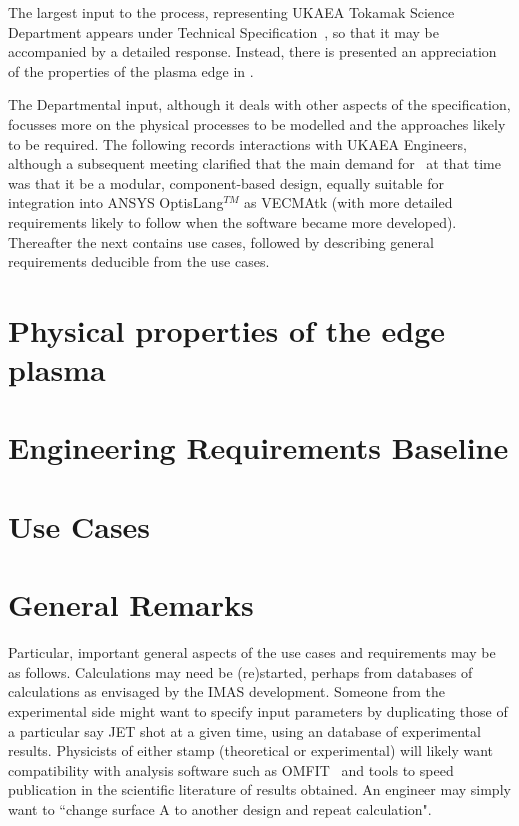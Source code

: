 
The largest input to the process, representing UKAEA Tokamak Science
Department appears under Technical Specification~, so that it may
be accompanied by a detailed response. Instead, there is presented an appreciation
of the properties of the plasma edge in .

The Departmental input, although it deals with other aspects of the specification,
focusses more on the physical processes to be modelled and the approaches likely to
be required. The following  records interactions with UKAEA Engineers, although
a subsequent meeting clarified that the main demand for \nep\ at that time was that it be a
modular, component-based design, equally suitable for integration into ANSYS OptisLang$^{TM}$
as VECMAtk (with more detailed requirements likely to follow when the software became more developed).
Thereafter the  next   contains use cases, followed by 
describing general requirements deducible from the use cases.

\section{Physical properties of the edge plasma}\label{sec:props}


\section{Engineering Requirements Baseline}\label{sec:RB2}


\section{Use Cases}\label{sec:use_case}





\section{General Remarks}\label{sec:general-remarks}
Particular, important general aspects of the use cases and  requirements may be
as follows.
Calculations may need be (re)started, perhaps from databases of calculations as envisaged by the 
IMAS development.  Someone from the experimental side might want to specify input parameters
by duplicating those of a particular say JET 
shot at a given time, using an database of experimental results.
Physicists of either stamp (theoretical or experimental) will likely want compatibility with
analysis software such as OMFIT~\cite{omfitwebsite} and tools to speed publication in
the scientific literature of results obtained.
An engineer may simply want to ``change surface A to another design and repeat calculation".

